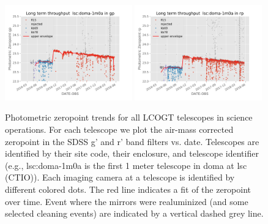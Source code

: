 \documentclass[]{spieman}
\begin{document}
\begin{figure}
\includegraphics[width=0.49\textwidth]{images/photzptrend-lsc-doma-1m0a-gp.png}  \hspace*{\fill}
\includegraphics[width=0.49\textwidth]{images/photzptrend-lsc-doma-1m0a-rp.png} \\[1ex]

\caption{\label{fig_zpLSC} Photometric zeropoint trends for all LCOGT telescopes in science
operations. For each telescope we plot the air-mass corrected zeropoint in the SDSS g' and r' band
filters vs. date. Telescopes are identified by their site code, their enclosure, and telescope
identifier (e.g., lsc:doma-1m0a is the first 1 meter telescope in doma at lsc (CTIO)). Each imaging
camera at a telescope is identified by different colored dots. The red line indicates a fit of the
zeropoint over time. Event where the mirrors were realuminized (and some selected cleaning events)
are indicated by a vertical dashed grey line.}

\end{figure}
\end{document}
